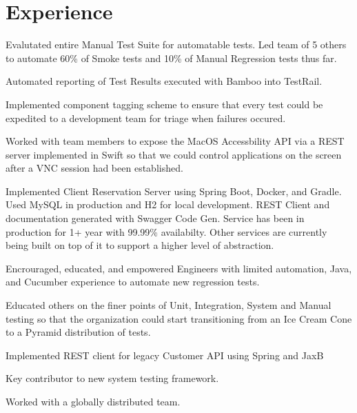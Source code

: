 \documentclass[letterpaper]{resume} %
\begin{document}
\hfill
%
%
\begin{minipage}[t]{0.66\textwidth} %


\section{Experience}

\vspace{\topsep} %
\begin{tightitemize}
\item Evalutated entire Manual Test Suite for automatable tests.  Led team of 5 others to automate 60\% of Smoke tests and 10\% of Manual Regression tests thus far.
\item Automated reporting of Test Results executed with Bamboo into TestRail.
\item Implemented component tagging scheme to ensure that every test could be expedited to a development team for triage when failures occured.
\item Worked with team members to expose the MacOS Accessbility API via a REST server implemented in Swift so that we could control applications on the screen after a VNC session had been established.
\item Implemented Client Reservation Server using Spring Boot, Docker, and Gradle.  Used MySQL in production and H2 for local development.  REST Client and documentation generated with Swagger Code Gen.  Service has been in production for 1+ year with 99.99\% availabilty.  Other services are currently being built on top of it to support a higher level of abstraction.
\item Encrouraged, educated, and empowered Engineers with limited automation, Java, and Cucumber experience to automate new regression tests.
\item Educated others on the finer points of Unit, Integration, System and Manual testing so that the organization could start transitioning from an Ice Cream Cone to a Pyramid distribution of tests.
\item Implemented REST client for legacy Customer API using Spring and JaxB
\item Key contributor to new system testing framework.
\item Worked with a globally distributed team.
\end{tightitemize}


\end{minipage}
\end{document}
